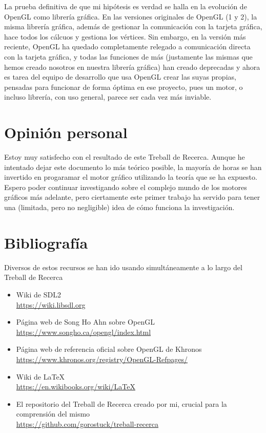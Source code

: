 La prueba definitiva de que mi hipótesis es verdad se halla en la evolución de OpenGL como librería gráfica. En las versiones originales de OpenGL (1 y 2), la misma librería gráfica, además de gestionar la comunicación con la tarjeta gráfica, hace todos los cálcuos y gestiona los vértices. Sin embargo, en la versión más reciente, OpenGL ha quedado completamente relegado a comunicación directa con la tarjeta gráfica, y todas las funciones de más (justamente las mismas que hemos creado nosotros en nuestra librería gráfica) han creado deprecadas y ahora es tarea del equipo de desarrollo que usa OpenGL crear las suyas propias, pensadas para funcionar de forma óptima en ese proyecto, pues un motor, o incluso librería, con uso general, parece ser cada vez más inviable.

\section{Opinión personal}
Estoy muy satisfecho con el resultado de este Treball de Recerca. Aunque he intentado dejar este documento lo más teórico posible, la mayoría de horas se han invertido en progaramar el motor gráfico utilizando la teoría que se ha expuesto. Espero poder continuar investigando sobre el complejo mundo de los motores gráficos más adelante, pero ciertamente este primer trabajo ha servido para tener una (limitada, pero no negligible) idea de cómo funciona la investigación.

\section{Bibliografía}
Diversos de estos recursos se han ido usando simultáneamente a lo largo del Treball de Recerca
\begin{itemize}
\item{Wiki de SDL2 \\ \url{https://wiki.libsdl.org}}
\item{Página web de Song Ho Ahn sobre OpenGL \\\url{https://www.songho.ca/opengl/index.html}}
\item{Página web de referencia oficial sobre OpenGL de Khronos \\\url{https://www.khronos.org/registry/OpenGL-Refpages/}}
\item{Wiki de \LaTeX \\ \url{https://en.wikibooks.org/wiki/LaTeX}}
\item{El repositorio del Treball de Recerca creado por mi, crucial para la comprensión del mismo\\
  \url{https://github.com/gorostuck/treball-recerca}}
\end{itemize}
